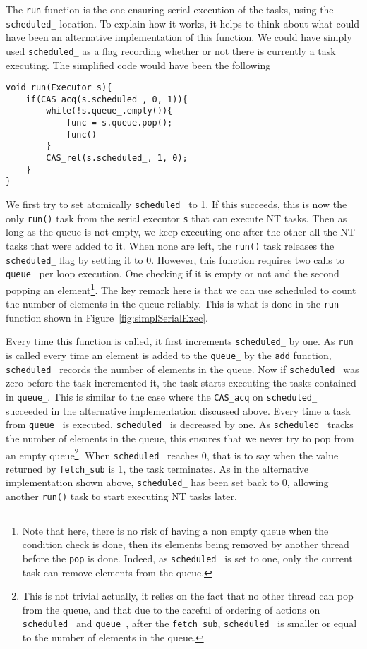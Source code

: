 The \texttt{run} function is the one ensuring serial execution of the tasks, using the \texttt{scheduled\_} location. To explain how it works, it helps to think about what could have been an alternative implementation of this function. We could have simply used \texttt{scheduled\_} as a flag recording whether or not there is currently a task executing. The simplified code would have been the following

\begin{lstlisting}
void run(Executor s){
	if(CAS_acq(s.scheduled_, 0, 1)){
		while(!s.queue_.empty()){
			func = s.queue.pop();
			func()
		}
		CAS_rel(s.scheduled_, 1, 0);
	}
}
\end{lstlisting}

We first try to set atomically \texttt{scheduled\_} to 1. If this succeeds, this is now the only \texttt{run()} task from the serial executor \texttt{s} that can execute NT tasks. Then as long as the queue is not empty, we keep executing one after the other all the NT tasks that were added to it. When none are left, the \texttt{run()} task releases the \texttt{scheduled\_} flag by setting it to 0. However, this function requires two calls to \texttt{queue\_} per loop execution. One checking if it is empty or not and the second popping an element\footnote{Note that here, there is no risk of having a non empty queue when the condition check is done, then its elements being removed by another thread before the \texttt{pop} is done. Indeed, as \texttt{scheduled\_} is set to one, only the current task can remove elements from the queue.}. The key remark here is that we can use scheduled to count the number of elements in the queue reliably. This is what is done in the \texttt{run} function shown in Figure~\ref{fig:simplSerialExec}.

Every time this function is called, it first increments \texttt{scheduled\_} by one. As \texttt{run} is called every time an element is added to the \texttt{queue\_} by the \texttt{add} function, \texttt{scheduled\_} records the number of elements in the queue. Now if \texttt{scheduled\_} was zero before the task incremented it, the task starts executing the tasks contained in \texttt{queue\_}. This is similar to the case where the \texttt{CAS\_acq} on \texttt{scheduled\_} succeeded in the alternative implementation discussed above. Every time a task from \texttt{queue\_} is executed, \texttt{scheduled\_} is decreased by one. As \texttt{scheduled\_} tracks the number of elements in the queue, this ensures that we never try to pop from an empty queue\footnote{This is not trivial actually, it relies on the fact that no other thread can pop from the queue, and that due to the careful of ordering of actions on \texttt{scheduled\_} and \texttt{queue\_}, after the \texttt{fetch\_sub}, \texttt{scheduled\_} is smaller or equal to the number of elements in the queue.}. When \texttt{scheduled\_} reaches 0, that is to say when the value returned by \texttt{fetch\_sub} is 1, the task terminates. As in the alternative implementation shown above, \texttt{scheduled\_} has been set back to 0, allowing another \texttt{run()} task to start executing NT tasks later.

